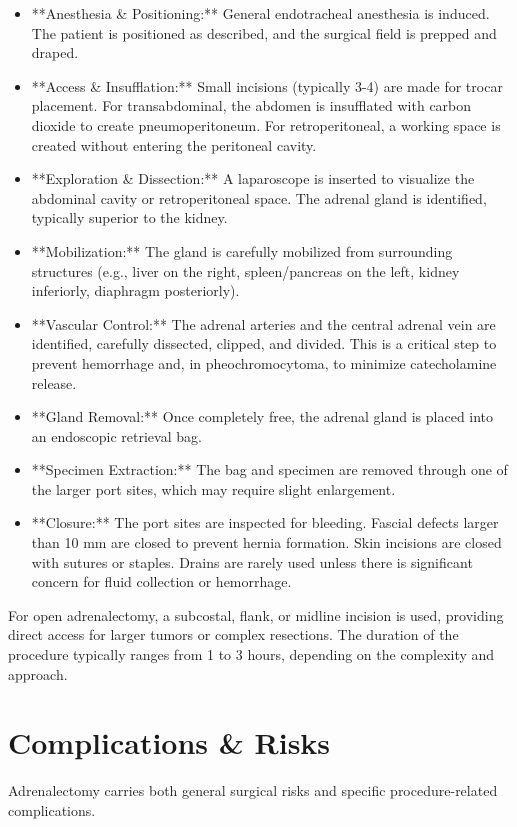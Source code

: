 \begin{itemize}
  \item **Anesthesia \& Positioning:** General endotracheal anesthesia is induced. The patient is positioned as described, and the surgical field is prepped and draped.
  \item **Access \& Insufflation:** Small incisions (typically 3-4) are made for trocar placement. For transabdominal, the abdomen is insufflated with carbon dioxide to create pneumoperitoneum. For retroperitoneal, a working space is created without entering the peritoneal cavity.
  \item **Exploration \& Dissection:** A laparoscope is inserted to visualize the abdominal cavity or retroperitoneal space. The adrenal gland is identified, typically superior to the kidney.
  \item **Mobilization:** The gland is carefully mobilized from surrounding structures (e.g., liver on the right, spleen/pancreas on the left, kidney inferiorly, diaphragm posteriorly).
  \item **Vascular Control:** The adrenal arteries and the central adrenal vein are identified, carefully dissected, clipped, and divided. This is a critical step to prevent hemorrhage and, in pheochromocytoma, to minimize catecholamine release.
  \item **Gland Removal:** Once completely free, the adrenal gland is placed into an endoscopic retrieval bag.
  \item **Specimen Extraction:** The bag and specimen are removed through one of the larger port sites, which may require slight enlargement.
  \item **Closure:** The port sites are inspected for bleeding. Fascial defects larger than 10 mm are closed to prevent hernia formation. Skin incisions are closed with sutures or staples. Drains are rarely used unless there is significant concern for fluid collection or hemorrhage.
\end{itemize}

For open adrenalectomy, a subcostal, flank, or midline incision is used, providing direct access for larger tumors or complex resections. The duration of the procedure typically ranges from 1 to 3 hours, depending on the complexity and approach.

\section*{Complications \& Risks}
Adrenalectomy carries both general surgical risks and specific procedure-related complications.

